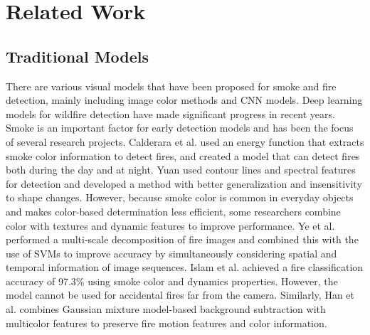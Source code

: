 \section{Related Work}

\subsection{Traditional Models}
There are various visual models that have been proposed for smoke and fire detection, mainly including image color methods and CNN models. Deep learning models for wildfire detection \cite{vision_pedro} have made significant progress in recent years. Smoke is an important factor for early detection models and has been the focus of several research projects. Calderara et al. \cite{calderara_vision_2011} used an energy function that extracts smoke color information to detect fires, and created a model that can detect fires both during the day and at night. Yuan \cite{an_robust_2022} used contour lines and spectral features for detection and developed a method with better generalization and insensitivity to shape changes. However, because smoke color is common in everyday objects and makes color-based determination less efficient, some researchers \cite{detection_zhao} combine color with textures and dynamic features to improve performance. Ye et al. \cite{dynamic_ye} performed a multi-scale decomposition of fire images and combined this with the use of SVMs to improve accuracy by simultaneously considering spatial and temporal information of image sequences. Islam et al. \cite{segment_islam} achieved a fire classification accuracy of 97.3\% using smoke color and dynamics properties. However, the model cannot be used for accidental fires far from the camera. Similarly, Han et al. \cite{gaussian_han} combines Gaussian mixture model-based background subtraction with multicolor features to preserve fire motion features and color information.

